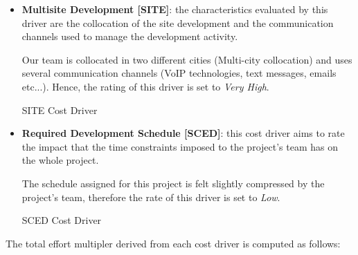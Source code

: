\begin{itemize}
	\begin{costdriverstable}{TOOL Cost Driver}
		\hline
	\end{costdriverstable}

	\item \textbf{Multisite Development [SITE]}: the characteristics evaluated by this driver are the collocation of the site development and the communication channels used to manage the development activity.

Our team is collocated in two different cities (Multi-city collocation) and uses several communication channels (VoIP technologies, text messages, emails etc...). Hence, the rating of this driver is set to \textit{Very High}.

	\begin{costdriverstable}{SITE Cost Driver}
		\hline
	\end{costdriverstable}

	\item \textbf{Required Development Schedule [SCED]}: this cost driver aims to rate the impact that the time constraints imposed to the project's team has on the whole project.

The schedule assigned for this project is felt slightly compressed by the project's team, therefore the rate of this driver is set to \textit{Low}.

	\begin{costdriverstable}{SCED Cost Driver}
		\hline
	\end{costdriverstable}

\end{itemize}
The total effort multipler derived from each cost driver is computed as follows:

